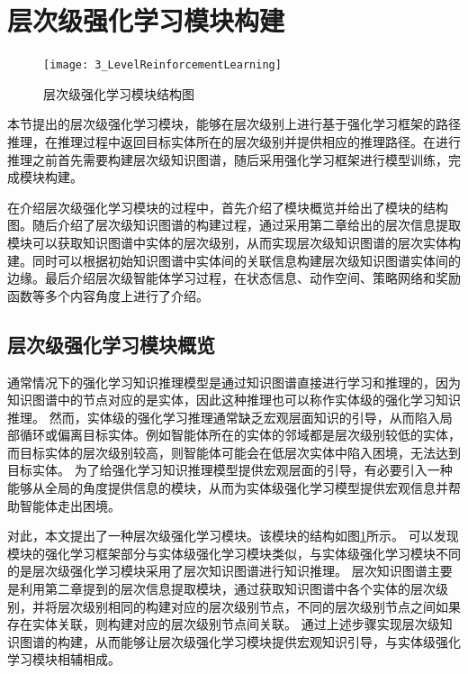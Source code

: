 \documentclass[algorithmlist, AutoFakeBold, AutoFakeSlant, figurelist, tablelist, nomlist, engineering]{seuthesix}
\begin{document}

\section{层次级强化学习模块构建}
\begin{figure}[t]
  \centering
  \texttt{[image: 3\_LevelReinforcementLearning]}
  \caption{层次级强化学习模块结构图}
  \label{3_LevelReinforcementLearning}
\end{figure}
本节提出的层次级强化学习模块，能够在层次级别上进行基于强化学习框架的路径推理，在推理过程中返回目标实体所在的层次级别并提供相应的推理路径。在进行推理之前首先需要构建层次级知识图谱，随后采用强化学习框架进行模型训练，完成模块构建。

在介绍层次级强化学习模块的过程中，首先介绍了模块概览并给出了模块的结构图。随后介绍了层次级知识图谱的构建过程，通过采用第二章给出的层次信息提取模块可以获取知识图谱中实体的层次级别，从而实现层次级知识图谱的层次实体构建。同时可以根据初始知识图谱中实体间的关联信息构建层次级知识图谱实体间的边缘。最后介绍层次级智能体学习过程，在状态信息、动作空间、策略网络和奖励函数等多个内容角度上进行了介绍。


\subsection{层次级强化学习模块概览}
通常情况下的强化学习知识推理模型是通过知识图谱直接进行学习和推理的，因为知识图谱中的节点对应的是实体，因此这种推理也可以称作实体级的强化学习知识推理。
然而，实体级的强化学习推理通常缺乏宏观层面知识的引导，从而陷入局部循环或偏离目标实体。例如智能体所在的实体的邻域都是层次级别较低的实体，而目标实体的层次级别较高，则智能体可能会在低层次实体中陷入困境，无法达到目标实体。
为了给强化学习知识推理模型提供宏观层面的引导，有必要引入一种能够从全局的角度提供信息的模块，从而为实体级强化学习模型提供宏观信息并帮助智能体走出困境。

对此，本文提出了一种层次级强化学习模块。该模块的结构如图\ref{3_LevelReinforcementLearning}所示。
可以发现模块的强化学习框架部分与实体级强化学习模块类似，与实体级强化学习模块不同的是层次级强化学习模块采用了层次知识图谱进行知识推理。
层次知识图谱主要是利用第二章提到的层次信息提取模块，通过获取知识图谱中各个实体的层次级别，并将层次级别相同的构建对应的层次级别节点，不同的层次级别节点之间如果存在实体关联，则构建对应的层次级别节点间关联。
通过上述步骤实现层次级知识图谱的构建，从而能够让层次级强化学习模块提供宏观知识引导，与实体级强化学习模块相辅相成。
\end{document}
